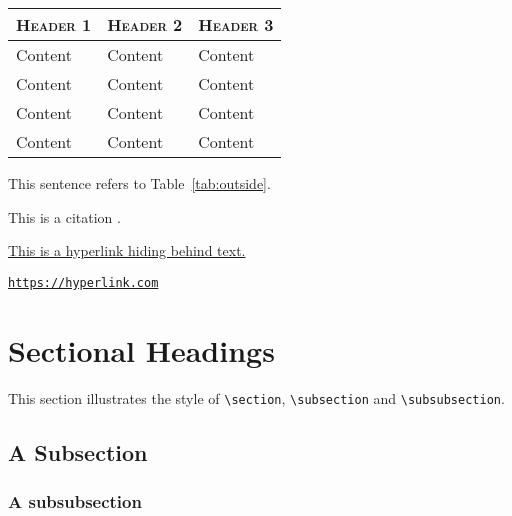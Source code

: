 \documentclass[a4paper,11pt,oneside,showtrims]{alpenthesis}
\begin{document}
\lipsum[3]

\begin{center}
    \label{tab:outside}
    \begin{tabular}{lll}
        \toprule
        \scshape Header 1 & \scshape Header 2 & \scshape Header 3 \\
        \midrule
        Content           & Content           & Content           \\
        Content           & Content           & Content           \\
        Content           & Content           & Content           \\
        Content           & Content           & Content           \\
        \bottomrule
    \end{tabular}
\end{center}

This sentence refers to Table~\ref{tab:outside}.

This is a citation \cite{testitem}.

\href{https://hyperlink.com}{This is a hyperlink hiding behind text.}

\href{https://hyperlink.com}{\nolinkurl{https://hyperlink.com}}

\section{Sectional Headings}

This section illustrates the  style of \verb|\section|, \verb|\subsection| and
\verb|\subsubsection|.

\subsection{A Subsection}

\lipsum[1]

\subsubsection{A subsubsection}
\end{document}
